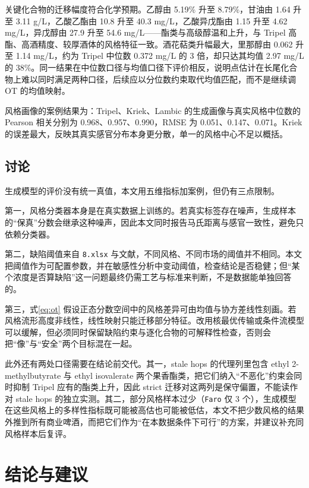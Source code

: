 ﻿\documentclass[UTF8,a4paper,zihao=-4]{ctexart}
\numberwithin{figure}{section}
\numberwithin{table}{section}
\numberwithin{equation}{section}
\newcommand{\file}[1]{\texttt{#1}}
\begin{document}
关键化合物的迁移幅度符合化学预期。乙醇由 5.19\% 升至 8.79\%，甘油由 1.64 升至 3.11 g/L，乙酸乙酯由 10.8 升至 40.3 mg/L，乙酸异戊酯由 1.15 升至 4.62 mg/L，异戊醇由 27.9 升至 54.6 mg/L——酯类与高级醇温和上升，与 Tripel 高酯、高酒精度、较厚酒体的风格特征一致。酒花萜类升幅最大，里那醇由 0.062 升至 1.14 mg/L，约为 Tripel 中位数 0.372 mg/L 的 3 倍，却只达其均值 2.97 mg/L 的 38\%。同一结果在中位数口径与均值口径下评价相反，说明点估计在长尾化合物上难以同时满足两种口径，后续应以分位数约束取代均值匹配，而不是继续调 OT 的均值映射。

风格画像的案例结果为：Tripel、Kriek、Lambic 的生成画像与真实风格中位数的 Pearson 相关分别为 0.968、0.957、0.990，RMSE 为 0.051、0.147、0.071。Kriek 的误差最大，反映其真实感官分布本身更分散，单一的风格中心不足以概括。

\subsection{讨论}

生成模型的评价没有统一真值，本文用五维指标加案例，但仍有三点限制。

第一，风格分类器本身是在真实数据上训练的。若真实标签存在噪声，生成样本的“保真”分数会继承这种噪声，因此本文同时报告马氏距离与感官一致性，避免只依赖分类器。

第二，缺陷阈值来自 \file{8.xlsx} 与文献，不同风格、不同市场的阈值并不相同。本文把阈值作为可配置参数，并在敏感性分析中变动阈值，检查结论是否稳健；但“某个浓度是否算缺陷”这一问题最终仍需工艺与标准来判断，不是数据能单独回答的。

第三，式\eqref{eq:ot} 假设正态分数空间中的风格差异可由均值与协方差线性刻画。若风格流形高度非线性，线性映射只能迁移部分特征。改用核最优传输或条件流模型可以缓解，但必须同时保留缺陷约束与逐化合物的可解释性检查，否则会把“像”与“安全”两个目标混在一起。

此外还有两处口径需要在结论前交代。其一，stale hops 的代理列里包含 ethyl 2-methylbutyrate 与 ethyl isovalerate 两个果香酯类，把它们纳入“不恶化”约束会同时抑制 Tripel 应有的酯类上升，因此 strict 迁移对这两列是保守偏置，不能读作对 stale hops 的独立实测。其二，部分风格样本过少（\file{Faro} 仅 3 个），生成模型在这些风格上的多样性指标既可能被高估也可能被低估，本文不把少数风格的结果外推到所有商业啤酒，而把它们作为“在本数据条件下可行”的方案，并建议补充同风格样本后复评。

\section{结论与建议}
\label{sec:conclusion}
\end{document}
